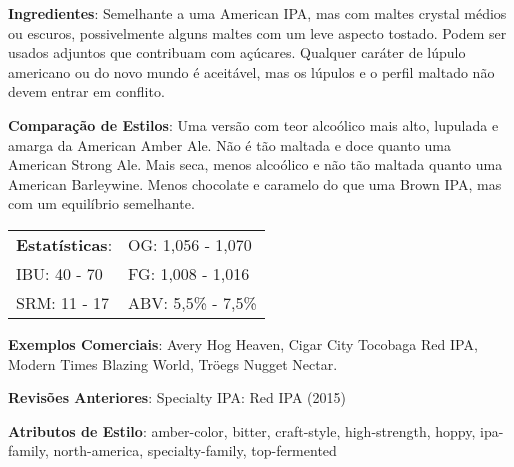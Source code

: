 \textbf{Ingredientes}: Semelhante a uma American IPA, mas com maltes crystal médios ou escuros, possivelmente alguns maltes com um leve aspecto tostado. Podem ser usados adjuntos que contribuam com açúcares. Qualquer caráter de lúpulo americano ou do novo mundo é aceitável, mas os lúpulos e o perfil maltado não devem entrar em conflito.

\textbf{Comparação de Estilos}: Uma versão com teor alcoólico mais alto, lupulada e amarga da American Amber Ale. Não é tão maltada e doce quanto uma American Strong Ale. Mais seca, menos alcoólico e não tão maltada quanto uma American Barleywine. Menos chocolate e caramelo do que uma Brown IPA, mas com um equilíbrio semelhante.

\begin{tabular}{@{}p{35mm}p{35mm}@{}}
  \textbf{Estatísticas}: & OG: 1,056 - 1,070 \\
  IBU: 40 - 70  & FG: 1,008 - 1,016 \\
  SRM: 11 - 17  & ABV: 5,5\% - 7,5\%
\end{tabular}

\textbf{Exemplos Comerciais}: Avery Hog Heaven, Cigar City Tocobaga Red IPA, Modern Times Blazing World, Tröegs Nugget Nectar.

\textbf{Revisões Anteriores}: Specialty IPA: Red IPA (2015)

\textbf{Atributos de Estilo}: amber-color, bitter, craft-style, high-strength, hoppy, ipa-family, north-america, specialty-family, top-fermented
